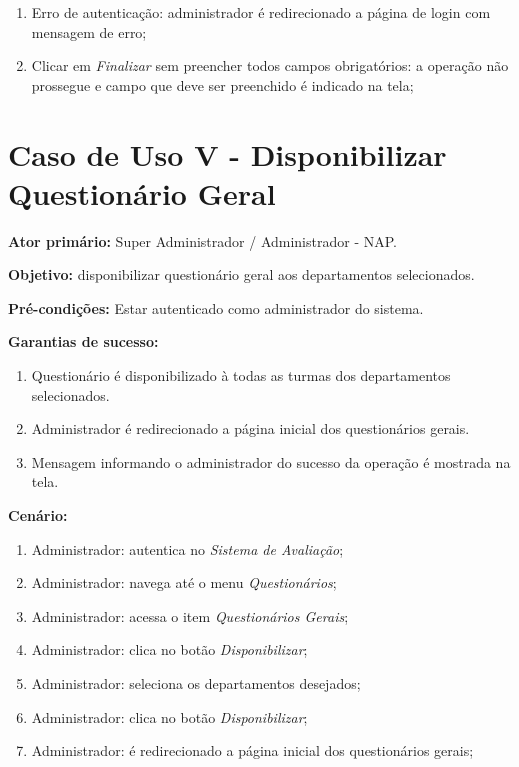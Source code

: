 \documentclass[
  12pt,       %
  openright,      %
  oneside,      %
  a4paper,      %
  english,      %
  french,        %
  spanish,     %
  brazil        %
  ]{abntex2-decsi}
\begin{document}
\begin{apendicesenv}
              \begin{enumerate}	
                  \item Erro de autenticação: administrador é redirecionado a página de login com mensagem de erro;
                  \item Clicar em \textit{Finalizar} sem preencher todos campos obrigatórios: a operação não prossegue e campo que deve ser preenchido é indicado na tela;
              \end{enumerate}
    
    \newpage
    
    \section{Caso de Uso V - Disponibilizar Questionário Geral}
    
      \textbf{Ator primário:} Super Administrador / Administrador - NAP.

      \textbf{Objetivo:} disponibilizar questionário geral aos departamentos selecionados.

      \textbf{Pré-condições:} Estar autenticado como administrador do sistema.

      \textbf{Garantias de sucesso:} 

              \begin{enumerate}

              \item Questionário é disponibilizado à todas as turmas dos departamentos selecionados. 
              \item Administrador é redirecionado a página inicial dos questionários gerais.
              \item Mensagem informando o administrador do sucesso da operação é mostrada na tela.

              \end{enumerate}

          \textbf{Cenário:}

          \begin{enumerate}
              \item Administrador: autentica no \textit{Sistema de Avaliação};
              \item Administrador: navega até o menu \textit{Questionários};
              \item Administrador: acessa o item \textit{Questionários Gerais};
              \item Administrador: clica no botão \textit{Disponibilizar};
              \item Administrador: seleciona os departamentos desejados;
              \item Administrador: clica no botão \textit{Disponibilizar};
              \item Administrador: é redirecionado a página inicial dos questionários gerais;
          \end{enumerate}


\end{apendicesenv}
\end{document}
